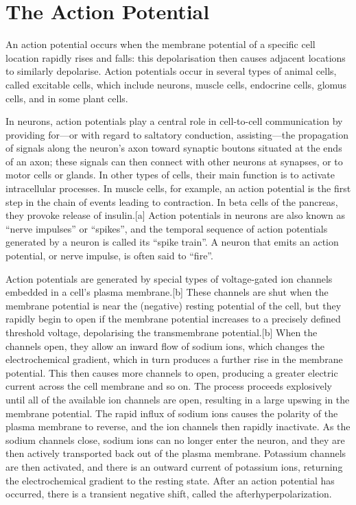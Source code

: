 \hypertarget{the-action-potential}{%
\section{The Action Potential}\label{the-action-potential}}

An action potential occurs when the membrane potential of a specific cell location rapidly rises and falls: this depolarisation then causes adjacent locations to similarly depolarise. Action potentials occur in several types of animal cells, called excitable cells, which include neurons, muscle cells, endocrine cells, glomus cells, and in some plant cells.

In neurons, action potentials play a central role in cell-to-cell communication by providing for---or with regard to saltatory conduction, assisting---the propagation of signals along the neuron's axon toward synaptic boutons situated at the ends of an axon; these signals can then connect with other neurons at synapses, or to motor cells or glands. In other types of cells, their main function is to activate intracellular processes. In muscle cells, for example, an action potential is the first step in the chain of events leading to contraction. In beta cells of the pancreas, they provoke release of insulin.{[}a{]} Action potentials in neurons are also known as ``nerve impulses'' or ``spikes'', and the temporal sequence of action potentials generated by a neuron is called its ``spike train''. A neuron that emits an action potential, or nerve impulse, is often said to ``fire''.

Action potentials are generated by special types of voltage-gated ion channels embedded in a cell's plasma membrane.{[}b{]} These channels are shut when the membrane potential is near the (negative) resting potential of the cell, but they rapidly begin to open if the membrane potential increases to a precisely defined threshold voltage, depolarising the transmembrane potential.{[}b{]} When the channels open, they allow an inward flow of sodium ions, which changes the electrochemical gradient, which in turn produces a further rise in the membrane potential. This then causes more channels to open, producing a greater electric current across the cell membrane and so on. The process proceeds explosively until all of the available ion channels are open, resulting in a large upswing in the membrane potential. The rapid influx of sodium ions causes the polarity of the plasma membrane to reverse, and the ion channels then rapidly inactivate. As the sodium channels close, sodium ions can no longer enter the neuron, and they are then actively transported back out of the plasma membrane. Potassium channels are then activated, and there is an outward current of potassium ions, returning the electrochemical gradient to the resting state. After an action potential has occurred, there is a transient negative shift, called the afterhyperpolarization.

